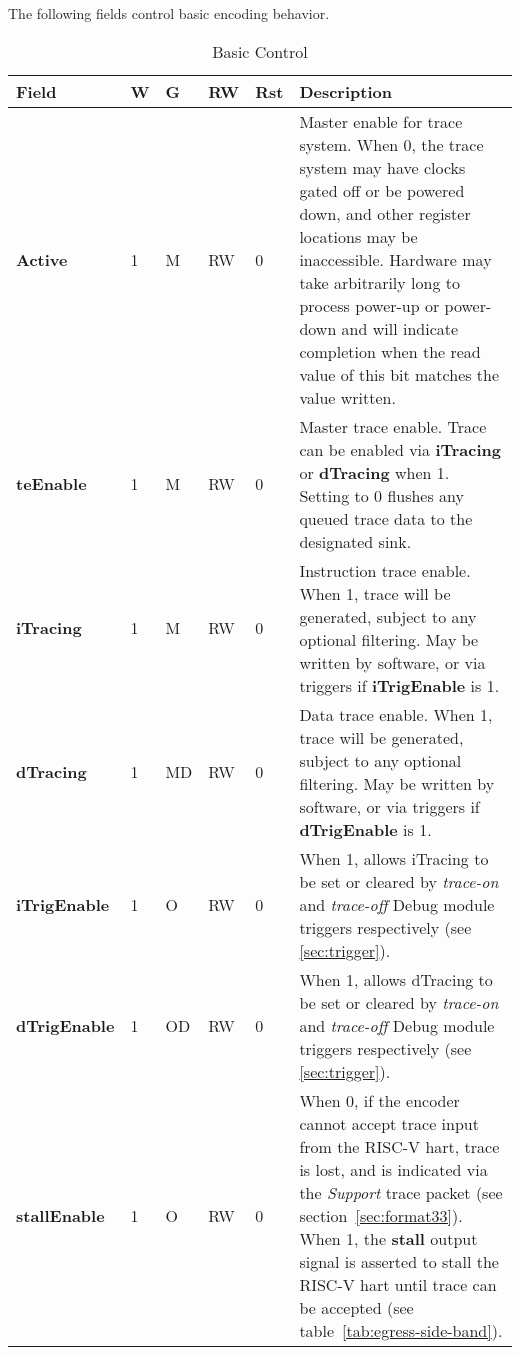 The following fields control basic encoding behavior.

\begin{table}[htp]
  \centering
  \caption{Basic Control}
  \label{tab:ctl-basic}
  \begin{tabulary}{\textwidth}{|l|l|l|l|l|p{90mm}|}
    \hline
    {\bf Field} & {\bf W} & {\bf G} & {\bf RW} & {\bf Rst} & {\bf Description} \\
    \hline
    \textbf{Active} & 1 & M & RW & 0 & Master enable for trace system.  When 0, the trace system may have clocks gated off or be powered down,
     and other register locations may be inaccessible.
      Hardware may take arbitrarily long to process power-up or power-down and will indicate completion when the read value of this bit
      matches the value written.\\
    \hline
    \textbf{teEnable} & 1 & M & RW & 0 & 
      Master trace enable.  Trace can be enabled via \textbf{iTracing}
      or \textbf{dTracing} when 1. Setting to 0 flushes any queued trace data to the designated sink.\\
    \hline
    \textbf{iTracing} & 1 & M & RW & 0 & Instruction trace enable.  When 1, trace will be generated,
       subject to any optional filtering.  May be written by software, or via triggers if \textbf{iTrigEnable} is 1.  \\
    \hline
    \textbf{dTracing} & 1 & MD & RW & 0 & Data trace enable.  When 1, trace will be generated,
       subject to any optional filtering.  May be written by software, or via triggers if \textbf{dTrigEnable} is 1.  \\
    \hline
    \textbf{iTrigEnable} & 1 & O & RW & 0 & When 1, allows iTracing to be set or cleared by \textit{trace-on} and \textit{trace-off} 
      Debug module triggers respectively (see \ref{sec:trigger}).\\
    \hline
    \textbf{dTrigEnable} & 1 & OD & RW & 0 & When 1, allows dTracing to be set or cleared by \textit{trace-on} and \textit{trace-off} 
      Debug module triggers respectively (see \ref{sec:trigger}).\\
    \hline
    \textbf{stallEnable} & 1 & O & RW & 0 & When 0, if the encoder cannot accept trace input from the RISC-V hart, trace is lost, and is
      indicated via the \textit{Support} trace packet (see section~\ref{sec:format33}).\newline
      When 1, the \textbf{stall} output signal is asserted to stall the RISC-V hart until trace can be accepted (see table~\ref{tab:egress-side-band}).\\

\end{tabulary}
\end{table}
